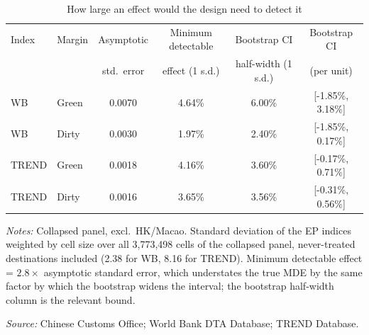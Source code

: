 \begin{table}[htbp]
\centering
\footnotesize
\caption{How large an effect would the design need to detect it}
\label{tab:mde}
\begin{threeparttable}
\begin{tabular}{llcccc}
\toprule
Index & Margin & Asymptotic & Minimum detectable & Bootstrap CI & Bootstrap CI \\
 & & std.\ error & effect (1 s.d.) & half-width (1 s.d.) & (per unit) \\
\midrule
WB & Green & 0.0070 & 4.64\% & 6.00\% & [-1.85\%, 3.18\%] \\
WB & Dirty & 0.0030 & 1.97\% & 2.40\% & [-1.85\%, 0.17\%] \\
TREND & Green & 0.0018 & 4.16\% & 3.60\% & [-0.17\%, 0.71\%] \\
TREND & Dirty & 0.0016 & 3.65\% & 3.56\% & [-0.31\%, 0.56\%] \\
\bottomrule
\end{tabular}
\begin{tablenotes}[flushleft]\footnotesize
\item \emph{Notes:} Collapsed panel, excl.\ HK/Macao. Standard deviation of the EP indices weighted by cell size over all 3,773,498 cells of the collapsed panel, never-treated destinations included (2.38 for WB, 8.16 for TREND). Minimum detectable effect = $2.8 \times$ asymptotic standard error, which understates the true MDE by the same factor by which the bootstrap widens the interval; the bootstrap half-width column is the relevant bound.
\item \textit{Source:} Chinese Customs Office; World Bank DTA Database; TREND Database.
\end{tablenotes}
\end{threeparttable}
\end{table}
